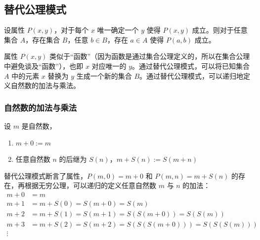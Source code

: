 \vspace{1em}

\subsection{替代公理模式}

\begin{axiom}
    设属性 $ P(x,y) $，对于每个 $ x $ 唯一确定一个 $ y $ 使得 $ P(x,y) $ 成立。则对于任意集合 $ A $，存在集合 $ B $，任意 $  b\in B $，存在 $ a\in A $ 使得 $ P(a,b) $ 成立。
\end{axiom}

\begin{note}
    属性 $ P(x,y) $ 类似于“函数”（因为函数是通过集合公理定义的，所以在集合公理中避免谈及“函数”），也即 $ x $ 对应唯一的 $ y $。通过替代公理模式，可以将已知集合 $ A $ 中的元素 $ x $ 替换为 $ y $ 生成一个新的集合 $ B $。通过替代公理模式，可以递归地定义自然数的加法与乘法。
\end{note}

\vspace{1em}

\subsubsection*{自然数的加法与乘法}

\begin{definition}[自然数的加法]
    设 $m$ 是自然数，
    \begin{enumerate}
        \item $ m+0:=m $
        \item 任意自然数 $ n $ 的后继为 $ S(n) $，$ m+S(n):=S(m+n) $
    \end{enumerate}
    \label{def:natural_addition}
\end{definition}

\begin{note}
    替代公理模式断言了属性，$P(m,0)=m+0$ 和 $P(m,n)=m+S(n)$ 的存在，再根据无穷公理，可以递归的定义任意自然数 $m$ 与 $n$ 的加法：
    \begin{align*}
        m+0 &= m\\
        m+1 &= m+S(0) = S(m+0)= S(m)\\
        m+2 &= m+S(1) = S(m+1)=S(S(m+0))=S(S(m))\\
        m+3 &= m+S(2) = S(m+2)=S(S(S(m+0)))=S(S(S(m)))\\
        \vdots
    \end{align*}
\end{note}
\newpage

